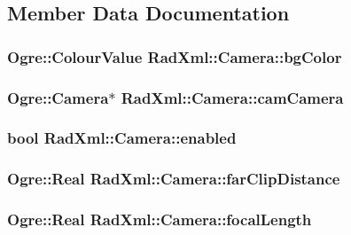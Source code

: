 \subsection{Member Data Documentation}
\hypertarget{class_rad_xml_1_1_camera_ac0099d6db699d1359f147de69de2ae7e}{
\subsubsection[{bg\-Color}]{\setlength{\rightskip}{0pt plus 5cm}Ogre\-::\-Colour\-Value Rad\-Xml\-::\-Camera\-::bg\-Color}}\label{class_rad_xml_1_1_camera_ac0099d6db699d1359f147de69de2ae7e}
\hypertarget{class_rad_xml_1_1_camera_ac0035bf46e68a723f00900c54b1eefc2}{
\subsubsection[{cam\-Camera}]{\setlength{\rightskip}{0pt plus 5cm}Ogre\-::\-Camera$\ast$ Rad\-Xml\-::\-Camera\-::cam\-Camera}}\label{class_rad_xml_1_1_camera_ac0035bf46e68a723f00900c54b1eefc2}
\hypertarget{class_rad_xml_1_1_camera_afdffce1a8c2271c28b298c6b2d753d36}{
\subsubsection[{enabled}]{\setlength{\rightskip}{0pt plus 5cm}bool Rad\-Xml\-::\-Camera\-::enabled}}\label{class_rad_xml_1_1_camera_afdffce1a8c2271c28b298c6b2d753d36}
\hypertarget{class_rad_xml_1_1_camera_a10b153eb52a5a23326b40ceabebd1c49}{
\subsubsection[{far\-Clip\-Distance}]{\setlength{\rightskip}{0pt plus 5cm}Ogre\-::\-Real Rad\-Xml\-::\-Camera\-::far\-Clip\-Distance}}\label{class_rad_xml_1_1_camera_a10b153eb52a5a23326b40ceabebd1c49}
\hypertarget{class_rad_xml_1_1_camera_a374efdd1be6681c19cbeda4cead0cd75}{
\subsubsection[{focal\-Length}]{\setlength{\rightskip}{0pt plus 5cm}Ogre\-::\-Real Rad\-Xml\-::\-Camera\-::focal\-Length}}\label{class_rad_xml_1_1_camera_a374efdd1be6681c19cbeda4cead0cd75}
